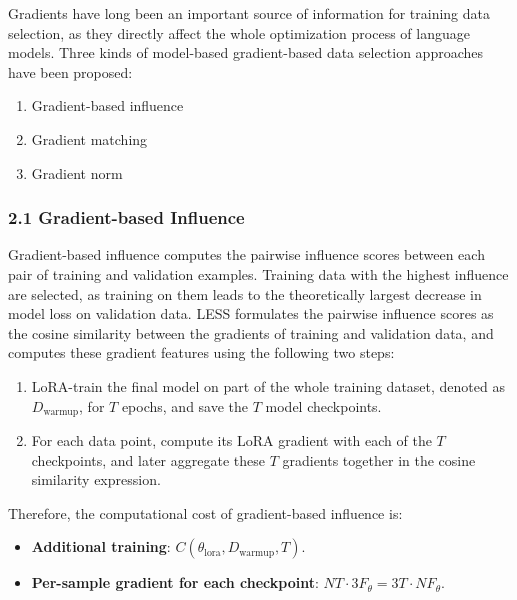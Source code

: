 Gradients have long been an important source of information for training data selection, as they directly affect the whole optimization process of language models. Three kinds of model-based gradient-based data selection approaches have been proposed:

\begin{enumerate}
    \item Gradient-based influence
    \item Gradient matching
    \item Gradient norm
\end{enumerate}

\subsubsection*{2.1 Gradient-based Influence}

Gradient-based influence computes the pairwise influence scores between each pair of training and validation examples. Training data with the highest influence are selected, as training on them leads to the theoretically largest decrease in model loss on validation data. LESS \cite{xia2024less} formulates the pairwise influence scores as the cosine similarity between the gradients of training and validation data, and computes these gradient features using the following two steps:

\begin{enumerate}
    \item LoRA-train the final model on part of the whole training dataset, denoted as $D_{\text{warmup}}$, for $T$ epochs, and save the $T$ model checkpoints.
    \item For each data point, compute its LoRA gradient with each of the $T$ checkpoints, and later aggregate these $T$ gradients together in the cosine similarity expression.
\end{enumerate}

Therefore, the computational cost of gradient-based influence is:

\begin{itemize}
    \item \textbf{Additional training}: $C(\theta_{\text{lora}}, D_{\text{warmup}}, T)$.
    \item \textbf{Per-sample gradient for each checkpoint}: $NT \cdot 3F_{\theta} = 3 T \cdot NF_{\theta}$.
\end{itemize}


